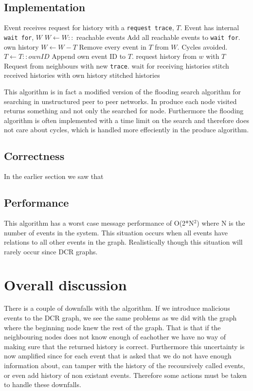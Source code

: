 	\subsection*{Implementation}
	\begin{algorithmic}
		\State Event receives request for history with a \texttt{request trace}, $T$.
		\State Event has internal \texttt{wait for}, $W$
		\State
		\State $W\gets W::$ reachable events \Comment Add all reachable events to \texttt{wait for}.
		\Return own history
		\Else
		\State $W\gets W-T$ \Comment Remove every event in $T$ from $W$. Cycles avoided.
		\State $T\gets T::ownID$ \Comment Append own event ID to $T$.
		\State
		\State request history from $w$ with $T$ \Comment Request from neighbours with new \texttt{trace}.
		\EndFor
		\State wait for receiving histories
		\State stitch received histories with own history
		\State
		\Return stitched histories
		\EndIf
	\end{algorithmic}
	
	\newpar This algorithm is in fact a modified version of the flooding search algorithm for searching in unstructured peer to peer networks. In produce each node visited returns something and not only the searched for node. Furthermore the flooding algorithm is often implemented with a time limit on the search and therefore does not care about cycles, which is handled more effeciently in the produce algorithm.
	
	\subsection*{Correctness}
	In the earlier section we saw that 
	
	\subsection{Performance}
	This algorithm has a worst case message performance of O(2*N$^2$) where N is the number of events in the system. This situation occurs when all events have relations to all other events in the graph. Realistically though this situation will rarely occur since DCR graphs.
	
	
	\section{Overall discussion}
	There is a couple of downfalls with the algorithm. If we introduce malicious events to the DCR graph, we see the same problems as we did with the graph where the beginning node knew the rest of the graph. That is that if the neighbouring nodes does not know enough of eachother we have no way of making sure that the returned history is correct. Furthermore this uncertainty is now amplified since for each event that is asked that we do not have enough information about, can tamper with the history of the recoursively called events, or even add history of non existant events. Therefore some actions must be taken to handle these downfalls.
	